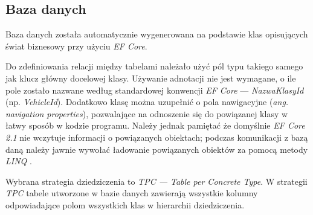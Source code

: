 \documentclass[eng,printmode,openany]{mgr}
\begin{document}
	
		
	\subsection{Baza danych}
	Baza danych została automatycznie wygenerowana na podstawie klas opisujących świat biznesowy przy użyciu \textit{EF Core}.
	
	Do zdefiniowania relacji między tabelami należało użyć pól typu takiego samego jak klucz główny docelowej klasy\cite{msdn-efcore-relationships}. Używanie adnotacji nie jest wymagane, o ile pole zostało nazwane według standardowej konwencji \textit{EF Core} — \textit{NazwaKlasyId} (np. \textit{VehicleId}). Dodatkowo klasę można uzupełnić o pola nawigacyjne (\textit{ang. navigation properties}), pozwalające na odnoszenie się do powiązanej klasy w łatwy sposób w kodzie programu. Należy jednak pamiętać że domyślnie \textit{EF Core 2.1} nie wczytuje informacji o powiązanych obiektach; podczas komunikacji z bazą daną należy jawnie wywołać ładowanie powiązanych obiektów za pomocą metody \textit{LINQ} .
	
	
	
	
	
	
	Wybrana strategia dziedziczenia to \textit{TPC — Table per Concrete Type}. W strategii \textit{TPC} tabele utworzone w bazie danych zawierają wszystkie kolumny odpowiadające polom wszystkich klas w hierarchii dziedziczenia.
	
\end{document}

